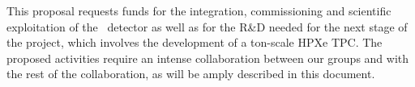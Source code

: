 
 
 This proposal requests funds for the integration, commissioning and scientific exploitation of the \Next\ detector as well as for the R\&D needed for the next stage of the project, 
 which involves the development of a ton-scale HPXe TPC. The proposed activities require an intense collaboration between our groups and with the rest of the collaboration, as will be amply described in this document. 
 
 
 
